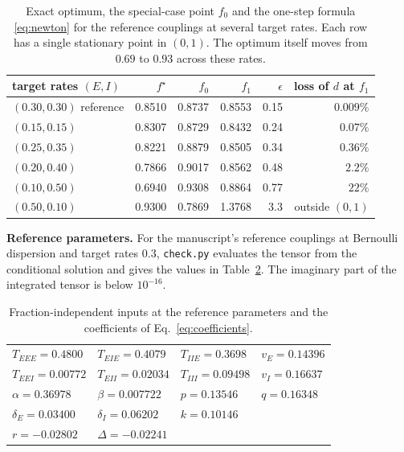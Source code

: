 \documentclass[11pt]{article}
\begin{document}
\begin{table}[h]
\centering
\begin{tabular}{lrrrrr}
\toprule
target rates $(E,I)$ & $f^\star$ & $f_0$ & $f_1$ & $\epsilon$ & loss of $d$ at $f_1$\\
\midrule
$(0.30,0.30)$ reference & 0.8510 & 0.8737 & 0.8553 & 0.15 & $0.009\%$\\
$(0.15,0.15)$ & 0.8307 & 0.8729 & 0.8432 & 0.24 & $0.07\%$\\
$(0.25,0.35)$ & 0.8221 & 0.8879 & 0.8505 & 0.34 & $0.36\%$\\
$(0.20,0.40)$ & 0.7866 & 0.9017 & 0.8562 & 0.48 & $2.2\%$\\
$(0.10,0.50)$ & 0.6940 & 0.9308 & 0.8864 & 0.77 & $22\%$\\
$(0.50,0.10)$ & 0.9300 & 0.7869 & 1.3768 & 3.3 & outside $(0,1)$\\
\bottomrule
\end{tabular}
\caption{Exact optimum, the special-case point $f_0$ and the one-step formula \eqref{eq:newton} for the reference couplings at several target rates. Each row has a single stationary point in $(0,1)$. The optimum itself moves from $0.69$ to $0.93$ across these rates.}
\label{tab:newton}
\end{table}

\textbf{Reference parameters.} For the manuscript's reference couplings at Bernoulli dispersion and target rates $0.3$, \texttt{check.py} evaluates the tensor from the conditional solution and gives the values in Table~\ref{tab:values}. The imaginary part of the integrated tensor is below $10^{-16}$.

\begin{table}[h]
\centering
\begin{tabular}{llll}
\toprule
$T_{EEE}=0.4800$ & $T_{EIE}=0.4079$ & $T_{IIE}=0.3698$ & $v_E=0.14396$\\
$T_{EEI}=0.00772$ & $T_{EII}=0.02034$ & $T_{III}=0.09498$ & $v_I=0.16637$\\
\midrule
$\alpha=0.36978$ & $\beta=0.007722$ & $p=0.13546$ & $q=0.16348$\\
$\delta_E=0.03400$ & $\delta_I=0.06202$ & $k=0.10146$ & \\
$r=-0.02802$ & $\Delta=-0.02241$ & & \\
\bottomrule
\end{tabular}
\caption{Fraction-independent inputs at the reference parameters and the coefficients of Eq.~\eqref{eq:coefficients}.}
\label{tab:values}
\end{table}
\end{document}
